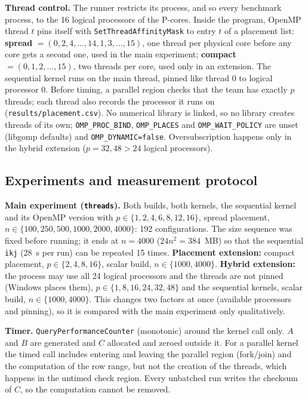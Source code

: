 \documentclass[11pt,a4paper]{article}
\begin{document}
\textbf{Thread control.} The runner restricts its process, and so every benchmark process,
to the 16 logical processors of the P-cores. Inside the program, OpenMP thread $t$ pins
itself with \texttt{SetThreadAffinityMask} to entry $t$ of a placement list:
\textbf{spread} $= (0, 2, 4, \dots, 14, 1, 3, \dots, 15)$, one thread per physical core
before any core gets a second one, used in the main experiment; \textbf{compact}
$= (0, 1, 2, \dots, 15)$, two threads per core, used only in an extension. The sequential
kernel runs on the main thread, pinned like thread 0 to logical processor 0. Before timing,
a parallel region checks that the team has exactly $p$ threads; each thread also records the
processor it runs on (\texttt{results/placement.csv}). No numerical library is linked, so no
library creates threads of its own; \texttt{OMP\_PROC\_BIND}, \texttt{OMP\_PLACES} and
\texttt{OMP\_WAIT\_POLICY} are unset (libgomp defaults) and \texttt{OMP\_DYNAMIC=false}.
Oversubscription happens only in the hybrid extension ($p = 32, 48 > 24$ logical
processors).

\subsection{Experiments and measurement protocol}

\textbf{Main experiment (\texttt{threads}).} Both builds, both kernels, the sequential
kernel and its OpenMP version with $p \in \{1, 2, 4, 6, 8, 12, 16\}$, spread placement,
$n \in \{100, 250, 500, 1000, 2000, 4000\}$: 192 configurations. The size sequence was fixed
before running; it ends at $n = 4000$ ($24n^2 = 384$~MB) so that the sequential
\texttt{ikj} (28~s per run) can be repeated 15 times. \textbf{Placement extension:}
compact placement, $p \in \{2, 4, 8, 16\}$, scalar build, $n \in \{1000, 4000\}$.
\textbf{Hybrid extension:} the process may use all 24 logical processors and the threads are
not pinned (Windows places them), $p \in \{1, 8, 16, 24, 32, 48\}$ and the sequential
kernels, scalar build, $n \in \{1000, 4000\}$. This changes two factors at once (available
processors and pinning), so it is compared with the main experiment only qualitatively.

\textbf{Timer.} \texttt{QueryPerformanceCounter} (monotonic) around the kernel call only.
$A$ and $B$ are generated and $C$ allocated and zeroed outside it. For a parallel kernel the
timed call includes entering and leaving the parallel region (fork/join) and the computation
of the row range, but not the creation of the threads, which happens in the untimed check
region. Every unbatched run writes the checksum of $C$, so the computation cannot be
removed.
\end{document}
